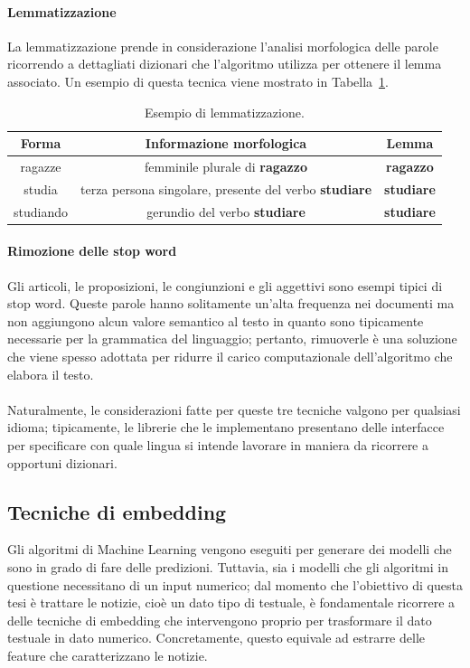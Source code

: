 \documentclass[12pt]{report}
\theoremstyle{definition}
\begin{document}
\paragraph{Lemmatizzazione} La lemmatizzazione prende in considerazione l'analisi morfologica delle parole ricorrendo a dettagliati dizionari che l'algoritmo utilizza per ottenere il lemma associato.
Un esempio di questa tecnica viene mostrato in Tabella~\ref{lemmatization}.
\begin{table}
\centering
 \begin{tabular}{|c|c|c|} 
 \hline 
 \textbf{Forma} & \textbf{Informazione morfologica} & \textbf{Lemma}
\\ [0.5ex] 
\hline
ragazze & femminile plurale di \textbf{ragazzo} & \textbf{ragazzo} \\
studia & terza persona singolare, presente del verbo \textbf{studiare} & \textbf{studiare} \\
studiando & gerundio del verbo \textbf{studiare} & \textbf{studiare} \\
 \hline
\end{tabular}
\caption{Esempio di lemmatizzazione.}
\label{lemmatization}
\end{table}

\paragraph{Rimozione delle stop word}
Gli articoli, le proposizioni, le congiunzioni e gli aggettivi sono esempi tipici di stop word. Queste parole hanno solitamente un'alta frequenza nei documenti ma non aggiungono alcun valore semantico al testo in quanto sono tipicamente necessarie per la grammatica del linguaggio; pertanto, rimuoverle è una soluzione che viene spesso adottata per ridurre il carico computazionale dell'algoritmo che elabora il testo.
\\
\\
Naturalmente, le considerazioni fatte per queste tre tecniche valgono per qualsiasi idioma; tipicamente, le librerie che le implementano presentano delle interfacce per specificare con quale lingua si intende lavorare in maniera da ricorrere a opportuni dizionari.

\subsection{Tecniche di embedding} \label{embedding}
Gli algoritmi di Machine Learning vengono eseguiti per generare dei modelli che sono in grado di fare delle predizioni. Tuttavia, sia i modelli che gli algoritmi in questione necessitano di un input numerico; dal momento che l'obiettivo di questa tesi è trattare le notizie, cioè un dato tipo di testuale, è fondamentale ricorrere a delle tecniche di embedding che intervengono proprio per trasformare il dato testuale in dato numerico.
Concretamente, questo equivale ad estrarre delle feature che caratterizzano le notizie.
\end{document}
